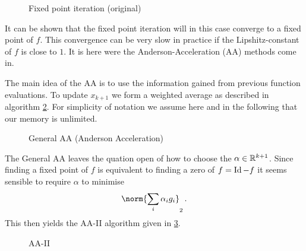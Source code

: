 \begin{figure}
\begin{algorithm}[H]
\caption{Fixed point iteration (original)}
\label{alg:original}

\BlankLine
{}
\end{algorithm}
\end{figure}

It can be shown that the fixed point iteration will in this case converge to a fixed point of $f$. This convergence can be very slow in practice if the Lipshitz-constant of $f$ is close to $1$. It is here were the Anderson-Acceleration (AA) methods come in.

The main idea of the AA is to use the information gained from previous function evaluations. To update $x_{k+1}$ we form a weighted average as described in algorithm \ref{alg:aai}. For simplicity of notation we assume here and in the following that our memory is unlimited.

\begin{figure}
\begin{algorithm}[H]
\caption{General AA (Anderson Acceleration)}
\label{alg:aai}


\BlankLine
{}
\end{algorithm}
\end{figure}

The General AA leaves the quation open of how to choose the $\alpha\in\mathbb{R}^{k+1}$. Since finding a fixed point of $f$ is equivalent to finding a zero of $f=\operatorname{Id}-f$ it seems sensible to require $\alpha$ to minimise
\begin{align*}
	\norm{\sum_i\alpha_ig_i}_2\,.
\end{align*}
This then yields the AA-II algorithm given in \ref{alg:aa2}.

\begin{figure}
\begin{algorithm}[H]
\caption{AA-II}
\label{alg:aa2}

\BlankLine
{}
\end{algorithm}
\end{figure}


